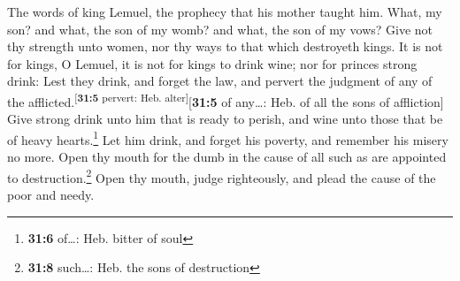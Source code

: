  The words of king Lemuel, the prophecy that his mother
taught him.  What, my son? and what, the son of my womb?
and what, the son of my vows?  Give not thy strength unto
women, nor thy ways to that which destroyeth kings.  It is
not for kings, O Lemuel, it is not for kings to drink wine; nor for
princes strong drink:  Lest they drink, and forget the
law, and pervert the judgment of any of the
afflicted.\textsuperscript{{[}\textbf{31:5} pervert: Heb.
alter{]}}{[}\textbf{31:5} of any\ldots: Heb. of all the sons of
affliction{]}  Give strong drink unto him that is ready to
perish, and wine unto those that be of heavy hearts.\footnote{\textbf{31:6}
  of\ldots: Heb. bitter of soul}  Let him drink, and
forget his poverty, and remember his misery no more.  Open
thy mouth for the dumb in the cause of all such as are appointed to
destruction.\footnote{\textbf{31:8} such\ldots: Heb. the sons of
  destruction}  Open thy mouth, judge righteously, and
plead the cause of the poor and needy.

